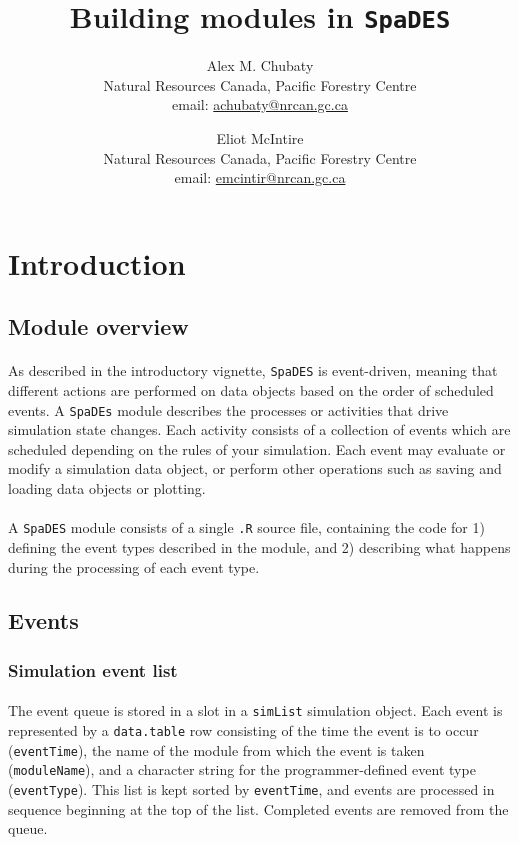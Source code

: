 \documentclass{article}
\title{Building modules in \texttt{SpaDES}}
\author{
  Alex M. Chubaty\\
  \small{Natural Resources Canada, Pacific Forestry Centre}\\
  \small{email: \href{mailto:achubaty@nrcan.gc.ca}{achubaty@nrcan.gc.ca}}
  \and
  Eliot McIntire\\
	\small{Natural Resources Canada, Pacific Forestry Centre}\\
	\small{email: \href{mailto:emcintir@nrcan.gc.ca}{emcintir@nrcan.gc.ca}}
}
\begin{document}


\maketitle

\tableofcontents

\newpage

\section{Introduction}

\subsection{Module overview}

\paragraph{}
As described in the introductory vignette, \texttt{SpaDES} is event-driven, meaning that different actions are performed on data objects based on the order of scheduled events. A \texttt{SpaDEs} module describes the processes or activities that drive simulation state changes. Each activity consists of a collection of events which are scheduled depending on the rules of your simulation. Each event may evaluate or modify a simulation data object, or perform other operations such as saving and loading data objects or plotting.

\paragraph{}
A \texttt{SpaDES} module consists of a single \texttt{.R} source file, containing the code for 1) defining the event types described in the module, and 2) describing what happens during the processing of each event type.

\subsection{Events}

\subsubsection{Simulation event list}

\paragraph{}
The event queue is stored in a slot in a \texttt{simList} simulation object. Each event is represented by a \texttt{data.table} row consisting of the time the event is to occur (\texttt{eventTime}), the name of the module from which the event is taken (\texttt{moduleName}), and a character string for the programmer-defined event type (\texttt{eventType}). This list is kept sorted by \texttt{eventTime}, and events are processed in sequence beginning at the top of the list. Completed events are removed from the queue.
\end{document}
